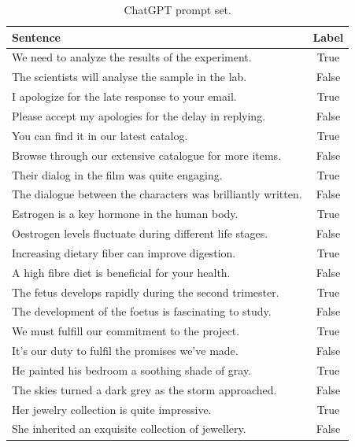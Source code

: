 \documentclass{article}
\begin{document}
\begin{table}[ht]
\centering
\begin{tabular}{|l|c|}
\hline
\textbf{Sentence} & \textbf{Label} \\
\hline
We need to analyze the results of the experiment. & True \\
The scientists will analyse the sample in the lab. & False \\
I apologize for the late response to your email. & True \\
Please accept my apologies for the delay in replying. & False \\
You can find it in our latest catalog. & True \\
Browse through our extensive catalogue for more items. & False \\
Their dialog in the film was quite engaging. & True \\
The dialogue between the characters was brilliantly written. & False \\
Estrogen is a key hormone in the human body. & True \\
Oestrogen levels fluctuate during different life stages. & False \\
Increasing dietary fiber can improve digestion. & True \\
A high fibre diet is beneficial for your health. & False \\
The fetus develops rapidly during the second trimester. & True \\
The development of the foetus is fascinating to study. & False \\
We must fulfill our commitment to the project. & True \\
It's our duty to fulfil the promises we've made. & False \\
He painted his bedroom a soothing shade of gray. & True \\
The skies turned a dark grey as the storm approached. & False \\
Her jewelry collection is quite impressive. & True \\
She inherited an exquisite collection of jewellery. & False \\
\hline
\end{tabular}
\caption{ChatGPT prompt set.}
\label{table:sentences1}
\end{table}
\end{document}
